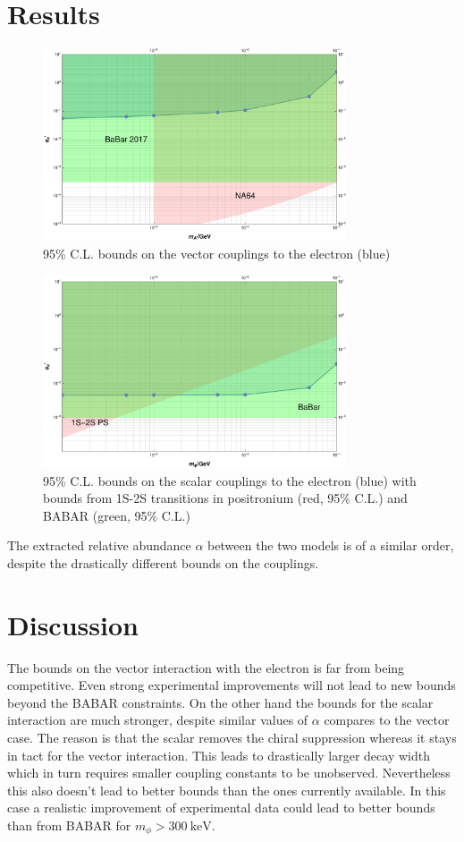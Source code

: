 \section{Results}
\begin{figure}[H]
  \centering
    \includegraphics[width=0.8\textwidth]{imgs/PionSpectrumVector}
    \caption{95\% C.L. bounds on the vector couplings to the electron (blue)}
    \label{fg:PiSpectrumVectorBounds}
\end{figure}

\begin{figure}[H]
  \centering
    \includegraphics[width=0.8\textwidth]{imgs/PionSpectrumScalar}
    \caption{95\% C.L. bounds on the scalar couplings to the electron (blue) with bounds from 1S-2S transitions in positronium (red, 95\% C.L.) and BABAR (green, 95\% C.L.)}
    \label{fg:PiSpectrumScalarBounds}
\end{figure}

The extracted relative abundance $\alpha$ between the two models is of a similar order, despite the drastically different bounds on the couplings.  
\section{Discussion}
The bounds on the vector interaction with the electron is far from being competitive. Even strong experimental improvements will not lead to new bounds beyond the BABAR constraints.
On the other hand the bounds for the scalar interaction are much stronger, despite similar values of $\alpha$ compares to the vector case. The reason is that the scalar removes the chiral suppression whereas it stays in tact for the vector interaction. This leads to drastically larger decay width which in turn requires smaller coupling constants to be unobserved. Nevertheless this also doesn't lead to better bounds than the ones currently available. In this case a realistic improvement of experimental data could lead to better bounds than from BABAR for $m_\phi>\SI{300}{\kilo\eV}$.
